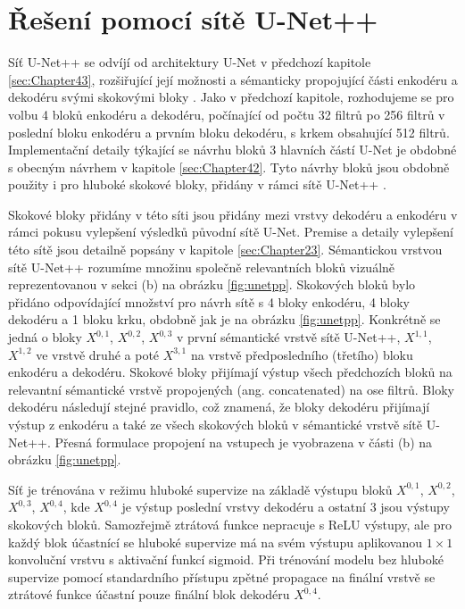 \section{Řešení pomocí sítě U-Net++}
\label{sec:Chapter44}
Síť U-Net++ se odvíjí od architektury U-Net v předchozí kapitole \ref{sec:Chapter43}, rozšiřující její možnosti a sémanticky propojující části enkodéru a dekodéru svými skokovými bloky \cite{unetpp}. Jako v předchozí kapitole, rozhodujeme se pro volbu 4 bloků enkodéru a dekodéru, počínající od počtu 32 filtrů po 256 filtrů v poslední bloku enkodéru a prvním bloku dekodéru, s krkem obsahující 512 filtrů. Implementační detaily týkající se návrhu bloků 3 hlavních částí U-Net je obdobné s obecným návrhem v kapitole \ref{sec:Chapter42}. Tyto návrhy bloků jsou obdobně použity i pro hluboké skokové bloky, přidány v rámci sítě U-Net++ \cite{unetpp}.

Skokové bloky přidány v této síti jsou přidány mezi vrstvy dekodéru a enkodéru v rámci pokusu vylepšení výsledků původní sítě U-Net. Premise a detaily vylepšení této sítě jsou detailně popsány v kapitole \ref{sec:Chapter23}. Sémantickou vrstvou sítě U-Net++ rozumíme množinu společně relevantních bloků vizuálně reprezentovanou v sekci (b) na obrázku \ref{fig:unetpp}. Skokových bloků bylo přidáno odpovídající množství pro návrh sítě s 4 bloky enkodéru, 4 bloky dekodéru a 1 bloku krku, obdobně jak je na obrázku \ref{fig:unetpp}. Konkrétně se jedná o bloky $X^{0,1}$, $X^{0,2}$, $X^{0,3}$ v první sémantické vrstvě sítě U-Net++, $X^{1,1}$, $X^{1,2}$ ve vrstvě druhé a poté $X^{3,1}$ na vrstvě předposledního (třetího) bloku enkodéru a dekodéru. Skokové bloky přijímají výstup všech předchozích bloků na relevantní sémantické vrstvě propojených (ang. concatenated) na ose filtrů. Bloky dekodéru následují stejné pravidlo, což znamená, že bloky dekodéru přijímají výstup z enkodéru a také ze všech skokových bloků v sémantické vrstvě sítě U-Net++. Přesná formulace propojení na vstupech je vyobrazena v části (b) na obrázku \ref{fig:unetpp}.

Síť je trénována v režimu hluboké supervize na základě výstupu bloků $X^{0,1}$, $X^{0,2}$, $X^{0,3}$, $X^{0,4}$, kde $X^{0,4}$ je výstup poslední vrstvy dekodéru a ostatní 3 jsou výstupy skokových bloků. Samozřejmě ztrátová funkce nepracuje s ReLU výstupy, ale pro každý blok účastnící se hluboké supervize má na svém výstupu aplikovanou $1\times1$ konvoluční vrstvu s aktivační funkcí sigmoid. Při trénování modelu bez hluboké supervize pomocí standardního přístupu zpětné propagace na finální vrstvě se ztrátové funkce účastní pouze finální blok dekodéru $X^{0, 4}$.
\endinput